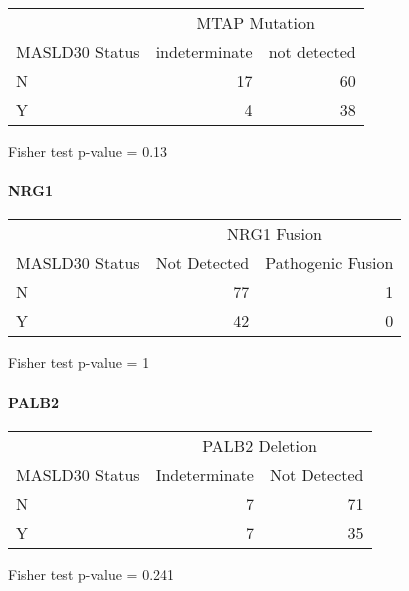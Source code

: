 \documentclass[
]{article}
\begin{document}
\begingroup
\fontsize{12.0pt}{14.4pt}\selectfont
\setlength{\LTpost}{0mm}
\begin{longtable}{l|rr}
\toprule
 & \multicolumn{2}{c}{MTAP Mutation} \\ 
\cmidrule(lr){2-3}
MASLD30 Status & indeterminate & not detected \\ 
\midrule\addlinespace[2.5pt]
N & 17 & 60 \\ 
Y & 4 & 38 \\ 
\bottomrule
\end{longtable}
\begin{minipage}{\linewidth}
Fisher test p-value =  0.13\\
\end{minipage}
\endgroup

\hypertarget{nrg1}{%
\paragraph{NRG1}\label{nrg1}}

\begingroup
\fontsize{12.0pt}{14.4pt}\selectfont
\setlength{\LTpost}{0mm}
\begin{longtable}{l|rr}
\toprule
 & \multicolumn{2}{c}{NRG1 Fusion} \\ 
\cmidrule(lr){2-3}
MASLD30 Status & Not Detected & Pathogenic Fusion \\ 
\midrule\addlinespace[2.5pt]
N & 77 & 1 \\ 
Y & 42 & 0 \\ 
\bottomrule
\end{longtable}
\begin{minipage}{\linewidth}
Fisher test p-value =  1\\
\end{minipage}
\endgroup
\pagebreak

\hypertarget{palb2}{%
\paragraph{PALB2}\label{palb2}}

\begingroup
\fontsize{12.0pt}{14.4pt}\selectfont
\setlength{\LTpost}{0mm}
\begin{longtable}{l|rr}
\toprule
 & \multicolumn{2}{c}{PALB2 Deletion} \\ 
\cmidrule(lr){2-3}
MASLD30 Status & Indeterminate & Not Detected \\ 
\midrule\addlinespace[2.5pt]
N & 7 & 71 \\ 
Y & 7 & 35 \\ 
\bottomrule
\end{longtable}
\begin{minipage}{\linewidth}
Fisher test p-value =  0.241\\
\end{minipage}
\endgroup
\end{document}

